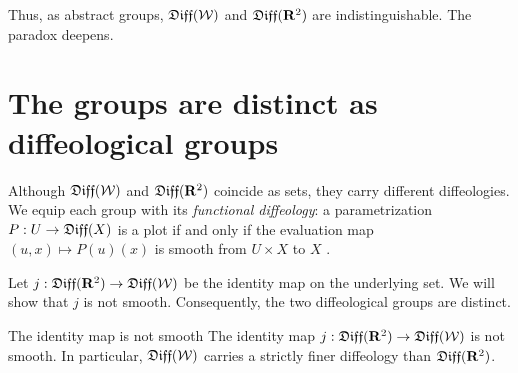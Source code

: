 Thus,
as abstract groups,
$\mathfrak{Diff}(\mathcal{W})$ and $\mathfrak{Diff}(\mathbf{R}^2)$ are indistinguishable.
The paradox deepens.

\section{The groups are distinct as diffeological groups}

Although $\mathfrak{Diff}(\mathcal{W})$ and $\mathfrak{Diff}(\mathbf{R}^2)$ coincide as sets,
they carry different diffeologies.
We equip each group with its \emph{functional diffeology}:
a parametrization $P: U \to \mathfrak{Diff}(X)$ is a plot if and only if the evaluation map
$(u,x) \mapsto P(u)(x)$ is smooth from $U \times X$ to $X$
\cite[\textsection\,1.57 and 1.61]{PIZ13}.

Let $j: \mathfrak{Diff}(\mathbf{R}^2) \to \mathfrak{Diff}(\mathcal{W})$ be the identity map on the underlying set.
We will show that $j$ is not smooth.
Consequently,
the two diffeological groups are distinct.

\begin{Article}{The identity map is not smooth}{}
  \label{prop:non-smooth}
  The identity map $j: \mathfrak{Diff}(\mathbf{R}^2) \to \mathfrak{Diff}(\mathcal{W})$ is not smooth.
  In particular,
  $\mathfrak{Diff}(\mathcal{W})$ carries a strictly finer diffeology than $\mathfrak{Diff}(\mathbf{R}^2)$.
\end{Article}


